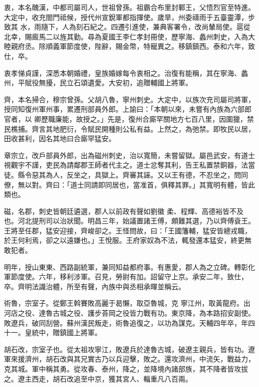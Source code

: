 \begin{pinyinscope}
 衷，本名醜漢，中都司屬司人，世祖曾孫。祖霸合布里封鄆王，父悟烈官至特進。大定中，收充閤門祗候，授代州宣銳軍都指揮使。歲旱，州委禱雨于五臺靈潭，步致其
 水，雨隨下，人為刻石紀之。四遷引進使，兼典客署令，改尚輦局使。扈從北幸，賜廄馬二以旌其勤。尋為夏國王李仁孝封冊使，歷寧海、蠡州刺史，入為大睦親府丞。除順義軍節度使，陛辭，賜金幣，特寵異之。移鎮鎮西。泰和六年，致仕，卒。



 衷孝悌貞謹，深悉本朝婚禮，皇族婚嫁每令衷相之。治復有能稱，其在寧海、蠡州，平賦役無擾，民立石頌遺愛。大安初，追贈輔國上將軍。



 齊，本名掃合，穆宗曾孫。父胡八魯，寧州刺史。大定中，以族次充司屬司將軍，授同知復州軍州事，累遷刑部員外郎。上諭曰：「本朝以來，未嘗有內族為六部郎官者，以
 卿歷職廉能，故授之。」先是，復州合廝罕關地方七百八里，因圍獵，禁民樵捕。齊言其地肥衍，令賦民開種則公私有益。上然之，為弛禁。即牧民以居，田收甚利，因名其地曰合廝罕猛安。



 章宗立，改戶部員外郎，出為磁州刺史，治以寬簡，未嘗留獄。屬邑武安，有道士視觀宇不謹，吏民為請鄰郡王師者代主之。道士忿奪其利，告王私置禁銅器，法當徒。縣令惡其為人，反坐之，具獄上。齊審其誣。又以王有德，不忍坐之，問同僚，無以對。齊曰：「道士同請即同居也，當准首，俱釋其罪。」其寬明有體，皆此類也。



 磁，名郡，刺史皆朝廷遴選，郡人以前政有聲如劉徽
 柔、程輝、高德裕皆不及也。河北提刑司以治狀聞。明昌三年，始議置諸王傅，頗難其選，乃以齊傅袞王。王將至任郡，猛安迎接，齊峻卻之。王怪問故，曰：「王國籓輔，猛安皆總戎職，於王何利焉，卻之以遠嫌也。」王悅服。王府家奴為不法，輒發還本猛安，終更無敢犯者。



 明年，授山東東、西路副統軍，兼同知益都府事。有惠愛，郡人為之立碑。轉彰化軍節度使。六年，移利涉軍。召見，勞尉有加。詔留守上京。承安二年，致仕，卒。齊明法識治體，所至有聲，內族中與丞相承暉並稱云。



 術魯，宗室子。從鄭王斡賽敗高麗于曷懶，取亞魯城，克
 寧江州，取黃龍府。出河店之役、達魯古城之役、護步荅岡之役皆力戰有功。東京降，為本路招安副使。敗遼兵，破同刮營。蘇州漢民叛走，術魯追復之，以功為謀克。天輔四年卒，年四十一。皇統中，贈鎮國上將軍。



 胡石改，宗室子也。從太祖攻寧江，敗遼兵於達魯古城，破遼主親兵，皆有功。遼軍來援濟州，胡石改與其兄實古乃以兵迎擊，敗之。還攻濟州，中流矢，戰益力，克其城。軍中稱其勇。從攻春、泰州，降之，並降境內諸部族，其不降者皆攻拔之。遼主西走，胡石改追至中京，獲其宮人、輜重凡八百兩。




\end{pinyinscope}
